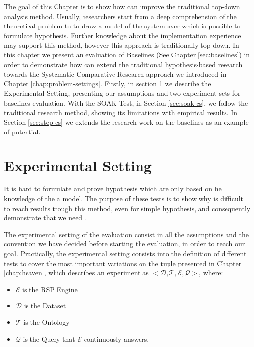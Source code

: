 The goal of this Chapter is to show how \name can improve the traditional top-down analysis method. Usually, researchers start from a deep comprehension of the theoretical problem  to to draw a model of the system over which is possible to formulate hypothesis. Further knowledge about  the implementation experience may support this method, however this approach is traditionally top-down. In this chapter we present an evaluation of \name Baselines (See Chapter \ref{sec:baselines}) in order to demonstrate how \name can extend the traditional hypothesis-based research towards the Systematic Comparative Research approach we introduced in Chapter \ref{chap:problem-settings}. Firstly, in section \ref{sec:experimental-setting} we describe the Experimental Setting, presenting our assumptions and two experiment sets for baselines evaluation. With the SOAK Test, in Section \ref{sec:soak-es}, we follow the traditional research method, showing its limitations with empirical results. In Section \ref{sec:step-es} we extends the research work on the baselines as an example of \name potential.

\section{Experimental Setting}
\label{sec:experimental-setting}

It is hard to formulate and prove hypothesis which are only based on he knowledge of the a model. The purpose of these tests is to show why is difficult to reach results trough this method, even for simple hypothesis, and consequently demonstrate that we need \namens .

The experimental setting of the evaluation consist in all the assumptions and the convention we have decided before starting the evaluation, in order to reach our goal. Practically, the experimental setting  consists into the definition of different tests to cover the most important variations on the tuple presented in Chapter \ref{chap:heaven}, which describes an experiment as $<\mathcal{D}, \mathcal{T},\mathcal{E}, \mathcal{Q}>$, where:
\begin{itemize}
\item $\mathcal{E}$ is the RSP Engine
\item $\mathcal{D}$ is the Dataset 
\item $\mathcal{T}$ is the Ontology
\item $\mathcal{Q}$ is the Query that $\mathcal{E}$ continuously answers.
\end{itemize}



